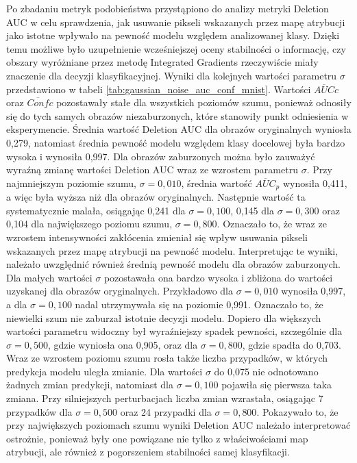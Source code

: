 Po zbadaniu metryk podobieństwa przystąpiono do analizy metryki Deletion AUC w celu sprawdzenia, jak usuwanie pikseli wskazanych przez mapę atrybucji jako istotne wpływało na pewność modelu względem analizowanej klasy. Dzięki temu możliwe było uzupełnienie wcześniejszej oceny stabilności o informację, czy obszary wyróżniane przez metodę Integrated Gradients rzeczywiście miały znaczenie dla decyzji klasyfikacyjnej. Wyniki dla kolejnych wartości parametru $\sigma$ przedstawiono w tabeli \ref{tab:gaussian_noise_auc_conf_mnist}. Wartości $\overline{AUC}{c}$ oraz $\overline{Conf}{c}$ pozostawały stałe dla wszystkich poziomów szumu, ponieważ odnosiły się do tych samych obrazów niezaburzonych, które stanowiły punkt odniesienia w eksperymencie. Średnia wartość Deletion AUC dla obrazów oryginalnych wyniosła 0{,}279, natomiast średnia pewność modelu względem klasy docelowej była bardzo wysoka i wynosiła 0{,}997. Dla obrazów zaburzonych można było zauważyć wyraźną zmianę wartości Deletion AUC wraz ze wzrostem parametru $\sigma$. Przy najmniejszym poziomie szumu, $\sigma = 0{,}010$, średnia wartość $\overline{AUC}_{p}$ wynosiła 0{,}411, a więc była wyższa niż dla obrazów oryginalnych. Następnie wartość ta systematycznie malała, osiągając 0{,}241 dla $\sigma = 0{,}100$, 0{,}145 dla $\sigma = 0{,}300$ oraz 0{,}104 dla największego poziomu szumu, $\sigma = 0{,}800$. Oznaczało to, że wraz ze wzrostem intensywności zakłócenia zmieniał się wpływ usuwania pikseli wskazanych przez mapę atrybucji na pewność modelu. Interpretując te wyniki, należało uwzględnić również średnią pewność modelu dla obrazów zaburzonych. Dla małych wartości $\sigma$ pozostawała ona bardzo wysoka i zbliżona do wartości uzyskanej dla obrazów oryginalnych. Przykładowo dla $\sigma = 0{,}010$ wynosiła 0{,}997, a dla $\sigma = 0{,}100$ nadal utrzymywała się na poziomie 0{,}991. Oznaczało to, że niewielki szum nie zaburzał istotnie decyzji modelu. Dopiero dla większych wartości parametru widoczny był wyraźniejszy spadek pewności, szczególnie dla $\sigma = 0{,}500$, gdzie wyniosła ona 0{,}905, oraz dla $\sigma = 0{,}800$, gdzie spadła do 0{,}703. Wraz ze wzrostem poziomu szumu rosła także liczba przypadków, w których predykcja modelu uległa zmianie. Dla wartości $\sigma$ do 0{,}075 nie odnotowano żadnych zmian predykcji, natomiast dla $\sigma = 0{,}100$ pojawiła się pierwsza taka zmiana. Przy silniejszych perturbacjach liczba zmian wzrastała, osiągając 7 przypadków dla $\sigma = 0{,}500$ oraz 24 przypadki dla $\sigma = 0{,}800$. Pokazywało to, że przy największych poziomach szumu wyniki Deletion AUC należało interpretować ostrożnie, ponieważ były one powiązane nie tylko z właściwościami map atrybucji, ale również z pogorszeniem stabilności samej klasyfikacji.

